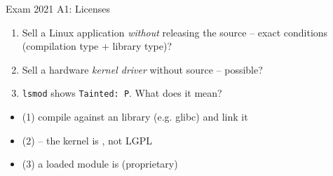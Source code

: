 \begin{example2}{Exam 2021 A1: Licenses}
    \begin{enumerate}
        \item Sell a Linux application \emph{without} releasing the source -- exact
              conditions (compilation type + library type)?
        \item Sell a hardware \emph{kernel driver} without source -- possible?
        \item \texttt{lsmod} shows \texttt{Tainted: P}. What does it mean?
    \end{enumerate}
    \tcblower
    \begin{itemize}
        \item (1) compile against an  library (e.g. glibc) and link
              it 
        \item (2)  -- the kernel is , not LGPL
        \item (3) a loaded module is  (proprietary)
    \end{itemize}
\end{example2}

\raggedcolumns
